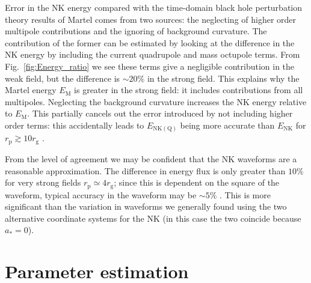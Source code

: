 \documentclass[useAMS,usedcolumn,usegraphicx,usenatbib]{mn2e}
\newcommand{\figref}[1]{Fig.~\ref{fig:#1}}
\newcommand{\sub}[1]{\ensuremath{_\mathrm{#1}}}
\begin{document}
Error in the NK energy compared with the time-domain black hole perturbation theory results of Martel comes from two sources: the neglecting of higher order multipole contributions and the ignoring of background curvature. The contribution of the former can be estimated by looking at the difference in the NK energy by including the current quadrupole and mass octupole terms. From \figref{Energy_ratio} we see these terms give a negligible contribution in the weak field, but the difference is $\sim20\%$ in the strong field. This explains why the Martel energy $E\sub{M}$ is greater in the strong field: it includes contributions from all multipoles. Neglecting the background curvature increases the NK energy relative to $E\sub{M}$. This partially cancels out the error introduced by not including higher order terms: this accidentally leads to $E\sub{NK(Q)}$ being more accurate than $E\sub{NK}$ for $r\sub{p} \gtrsim 10 r\sub{g}$ \citep{Tanaka1993}.

From the level of agreement we may be confident that the NK waveforms are a reasonable approximation. The difference in energy flux is only greater than $10\%$ for very strong fields $r\sub{p} \simeq 4 r\sub{g}$; since this is dependent on the square of the waveform, typical accuracy in the waveform may be $\sim 5\%$ \citep{Gair2005, Tanaka1993}. This is more significant than the variation in waveforms we generally found using the two alternative coordinate systems for the NK (in this case the two coincide because $a_\ast = 0$).

\section{Parameter estimation}\label{sec:Estimation}
\end{document}
